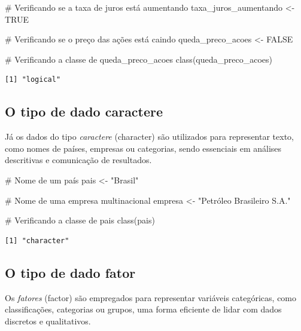 \documentclass[
  portuguese,
  letterpaper,
  DIV=11,
  numbers=noendperiod]{scrreprt}
\newenvironment{Shaded}{\begin{snugshade}}{\end{snugshade}}
\newcommand{\CommentTok}[1]{\textcolor[rgb]{0.37,0.37,0.37}{#1}}
\newcommand{\ConstantTok}[1]{\textcolor[rgb]{0.56,0.35,0.01}{#1}}
\newcommand{\FunctionTok}[1]{\textcolor[rgb]{0.28,0.35,0.67}{#1}}
\newcommand{\NormalTok}[1]{\textcolor[rgb]{0.00,0.23,0.31}{#1}}
\newcommand{\OtherTok}[1]{\textcolor[rgb]{0.00,0.23,0.31}{#1}}
\newcommand{\StringTok}[1]{\textcolor[rgb]{0.13,0.47,0.30}{#1}}
\theoremstyle{definition}
\theoremstyle{remark}
\begin{document}
\begin{Shaded}
\begin{Highlighting}[]
\CommentTok{\# Verificando se a taxa de juros está aumentando}
\NormalTok{taxa\_juros\_aumentando }\OtherTok{\textless{}{-}} \ConstantTok{TRUE}

\CommentTok{\# Verificando se o preço das ações está caindo}
\NormalTok{queda\_preco\_acoes }\OtherTok{\textless{}{-}} \ConstantTok{FALSE}

\CommentTok{\# Verificando a classe de queda\_preco\_acoes}
\FunctionTok{class}\NormalTok{(queda\_preco\_acoes)}
\end{Highlighting}
\end{Shaded}

\begin{verbatim}
[1] "logical"
\end{verbatim}

\subsection{O tipo de dado caractere}\label{o-tipo-de-dado-caractere}

Já os dados do tipo \emph{caractere} (character) são utilizados para
representar texto, como nomes de países, empresas ou categorias, sendo
essenciais em análises descritivas e comunicação de resultados.

\begin{Shaded}
\begin{Highlighting}[]
\CommentTok{\# Nome de um país}
\NormalTok{pais }\OtherTok{\textless{}{-}} \StringTok{"Brasil"}

\CommentTok{\# Nome de uma empresa multinacional}
\NormalTok{empresa }\OtherTok{\textless{}{-}} \StringTok{"Petróleo Brasileiro S.A."}

\CommentTok{\# Verificando a classe de pais}
\FunctionTok{class}\NormalTok{(pais)}
\end{Highlighting}
\end{Shaded}

\begin{verbatim}
[1] "character"
\end{verbatim}

\subsection{O tipo de dado fator}\label{o-tipo-de-dado-fator}

Os \emph{fatores} (factor) são empregados para representar variáveis
categóricas, como classificações, categorias ou grupos, uma forma
eficiente de lidar com dados discretos e qualitativos.
\end{document}

